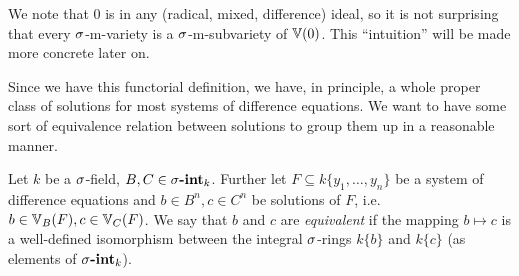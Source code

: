 We note that $0$ is in any (radical, mixed, difference) ideal, so it is not surprising that every $\sigma$-m-variety is a $\sigma$-m-subvariety of $\mathbb{V}(0)$. This ``intuition'' will be made more concrete later on.

Since we have this functorial definition, we have, in principle, a whole proper class of solutions for most systems of difference equations. 
We want to have some sort of equivalence relation between solutions to group them up in a reasonable manner.

\begin{defn}\label{equivsols}
Let $k$ be a $\sigma$-field, $B,C \in \sigma\text{{\normalfont\textbf{-int}}}_k$. Further let $F \subseteq k\{y_1,\ldots,y_n\}$ be a system of difference equations and $b \in B^n, c \in C^n$ be solutions of $F$, i.e. $b \in \mathbb{V}_B(F), c \in \mathbb{V}_C(F)$.
We say that $b$ and $c$ are \emph{equivalent} if the mapping $b \mapsto c$ is a well-defined isomorphism between the integral $\sigma$-rings $k\{b\}$ and $k\{c\}$  (as elements of $\sigma\text{{\normalfont\textbf{-int}}}_k$). 
\end{defn}


